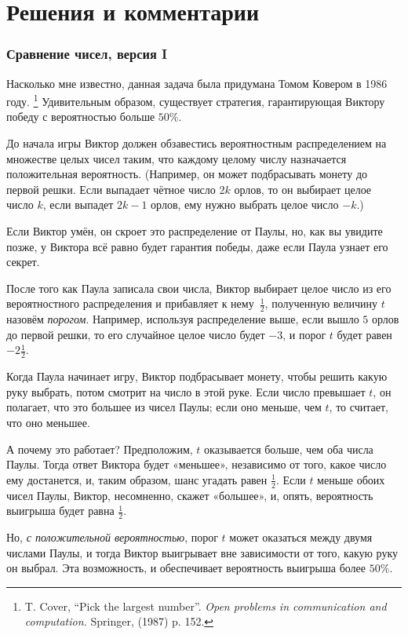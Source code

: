 \section*{Решения и комментарии}

\subsubsection*{Сравнение чисел, версия I}%

Насколько мне известно, данная задача была придумана Томом Ковером %
в 1986 году.%
\footnote{T. Cover, ``Pick the largest number''. \emph{Open problems in communication and computation.} Springer, (1987) p. 152.}
Удивительным образом, существует стратегия, гарантирующая Виктору победу с вероятностью больше $50\%$.

\medskip

До начала игры Виктор должен обзавестись вероятностным распределением на множестве целых чисел таким, что каждому целому числу назначается положительная вероятность.
(Например, он может подбрасывать монету до первой решки.
Если выпадает чётное число $2k$ орлов, то он выбирает целое число $k$, если выпадет $2k-1$ орлов, ему нужно выбрать целое число $-k$.)

Если Виктор умён, он скроет это распределение от Паулы, но, как вы увидите позже, у Виктора всё равно будет гарантия победы, даже если Паула узнает его секрет.

После того как Паула записала свои числа, Виктор выбирает целое число из его вероятностного распределения и прибавляет к нему~$\tfrac12$, полученную величину  $t$ назовём \emph{порогом}.
Например, используя распределение выше, если вышло $5$ орлов до первой решки, то его случайное целое число будет $-3$, и порог $t$ будет равен~$-2 \tfrac12$.

Когда Паула начинает игру, Виктор подбрасывает монету, чтобы решить какую руку выбрать, потом смотрит на число в этой руке.
Если число превышает $t$, он полагает, что это большее из чисел Паулы; если оно меньше, чем $t$, то считает, что оно меньшее.

А почему это работает? 
Предположим, $t$ оказывается больше, чем оба числа Паулы.
Тогда ответ Виктора будет «меньшее», независимо от того, какое число ему достанется, и, таким образом, шанс угадать равен $\tfrac12$.
Если $t$ меньше обоих чисел Паулы, Виктор, несомненно, скажет «большее», и, опять, вероятность выигрыша будет равна $\tfrac12$.

Но, \emph{с положительной вероятностью}, порог $t$ может оказаться между двумя числами Паулы, и тогда Виктор выигрывает вне зависимости от того, какую руку он выбрал.
Эта возможность, и обеспечивает вероятность выигрыша более $50\%$.\heart

